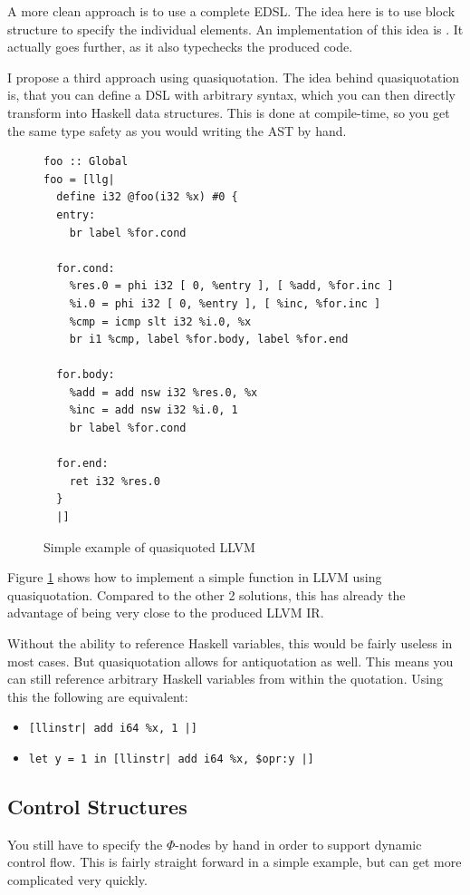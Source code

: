 \documentclass[a4paper,bibliography=totocnumbered,parskip,headsepline]{scrbook}
\begin{document}
A more clean approach is to use a complete EDSL.
The idea here is to use block structure to specify the individual elements.
An implementation of this idea is .
It actually goes further, as it also typechecks the produced code.

I propose a third approach using quasiquotation\cite{mainland2007quote}.
The idea behind quasiquotation is, that you can define a DSL with arbitrary syntax, which you can then directly transform into Haskell data structures.
This is done at compile-time, so you get the same type safety as you would writing the AST by hand.

\begin{figure}
\begin{lstlisting}
foo :: Global
foo = [llg|
  define i32 @foo(i32 %x) #0 {
  entry:
    br label %for.cond

  for.cond:
    %res.0 = phi i32 [ 0, %entry ], [ %add, %for.inc ]
    %i.0 = phi i32 [ 0, %entry ], [ %inc, %for.inc ]
    %cmp = icmp slt i32 %i.0, %x
    br i1 %cmp, label %for.body, label %for.end

  for.body:
    %add = add nsw i32 %res.0, %x
    %inc = add nsw i32 %i.0, 1
    br label %for.cond

  for.end:
    ret i32 %res.0
  }
  |]
\end{lstlisting}
\caption{Simple example of quasiquoted LLVM}
\label{fig:simplequote}
\end{figure}

Figure \ref{fig:simplequote} shows how to implement a simple function in LLVM using quasiquotation.
Compared to the other 2 solutions, this has already the advantage of being very close to the produced LLVM IR.

Without the ability to reference Haskell variables, this would be fairly useless in most cases.
But quasiquotation allows for antiquotation as well.
This means you can still reference arbitrary Haskell variables from within the quotation.
Using this the following are equivalent:
\begin{itemize}[noitemsep]
 \item \lstinline{[llinstr| add i64 %x, 1 |]}
 \item \lstinline{let y = 1 in [llinstr| add i64 %x, $opr:y |]}
\end{itemize}

\subsection{Control Structures}
You still have to specify the $\Phi$-nodes by hand in order to support dynamic control flow.
This is fairly straight forward in a simple example, but can get more complicated very quickly.
\end{document}
